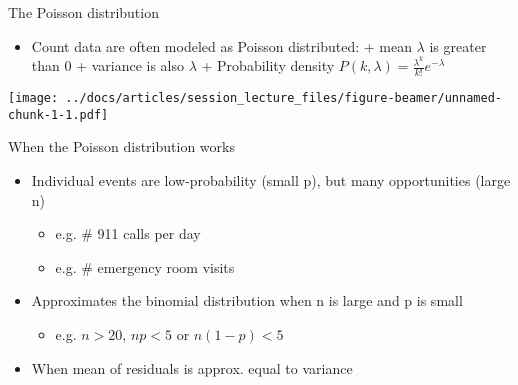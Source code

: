\documentclass[ignorenonframetext,]{beamer}
\providecommand{\tightlist}{%
  \setlength{\itemsep}{0pt}\setlength{\parskip}{0pt}}
\begin{document}
\begin{frame}{The Poisson distribution}
\protect\hypertarget{the-poisson-distribution}{}

\begin{itemize}
\tightlist
\item
  Count data are often modeled as Poisson distributed: + mean
  \(\lambda\) is greater than 0 + variance is also \(\lambda\) +
  Probability density
  \(P(k, \lambda) = \frac{\lambda^k}{k!} e^{-\lambda}\)
\end{itemize}

\texttt{[image: ../docs/articles/session\_lecture\_files/figure-beamer/unnamed-chunk-1-1.pdf]}

\end{frame}

\begin{frame}{When the Poisson distribution works}
\protect\hypertarget{when-the-poisson-distribution-works}{}

\begin{itemize}
\tightlist
\item
  Individual events are low-probability (small p), but many
  opportunities (large n)

  \begin{itemize}
  \tightlist
  \item
    e.g. \# 911 calls per day
  \item
    e.g. \# emergency room visits
  \end{itemize}
\item
  Approximates the binomial distribution when n is large and p is small

  \begin{itemize}
  \tightlist
  \item
    e.g. \(n > 20\), \(np < 5\) or \(n(1-p) < 5\)
  \end{itemize}
\item
  When mean of residuals is approx. equal to variance
\end{itemize}

\end{frame}
\end{document}
